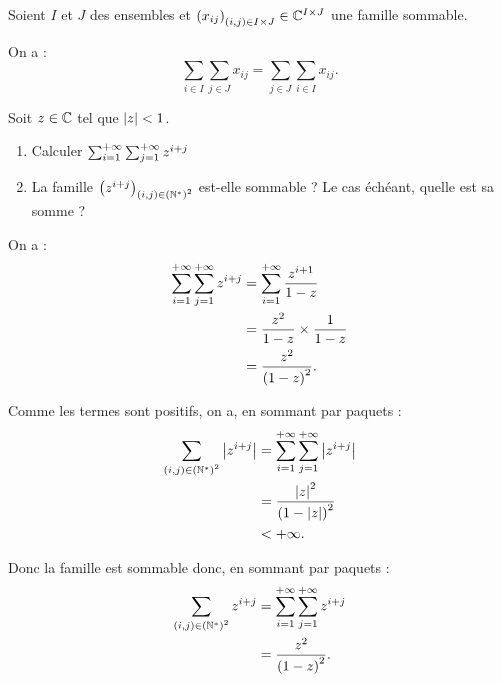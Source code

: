 \begin{dem}
\end{dem}

\begin{cor}
Soient \(I\) et \(J\) des ensembles et \(\left(x_{ij}\right)_{\left(i,j\right)\in I\times J}\in\mathbb{C}^{I\times J}\) une famille sommable.

On a : \[\sum_{i\in I}\sum_{j\in J}x_{ij}=\sum_{j\in J}\sum_{i\in I}x_{ij}.\]
\end{cor}

\begin{exoex}
Soit \(z\in\mathbb{C}\) tel que \(\left\lvert z\right\rvert<1\).

\begin{enumerate}
    \item Calculer \(\sum_{i=1}^{+\infty}\sum_{j=1}^{+\infty}z^{i+j}\) \\
    \item La famille \(\left(z^{i+j}\right)_{\left(i,j\right)\in\left(\mathbb{N}^*\right)^2}\) est-elle sommable ? Le cas échéant, quelle est sa somme ?
\end{enumerate}
\end{exoex}

\begin{corr}[1]
On a : \[\begin{aligned}
\sum_{i=1}^{+\infty}\sum_{j=1}^{+\infty}z^{i+j}&=\sum_{i=1}^{+\infty}\dfrac{z^{i+1}}{1-z} \\
&=\dfrac{z^2}{1-z}\times\dfrac{1}{1-z} \\
&=\dfrac{z^2}{\left(1-z\right)^2}.
\end{aligned}\]
\end{corr}

\begin{corr}[2]
Comme les termes sont positifs, on a, en sommant par paquets : \[\begin{aligned}
\sum_{\left(i,j\right)\in\left(\mathbb{N}^*\right)^2}\left\lvert z^{i+j}\right\rvert&=\sum_{i=1}^{+\infty}\sum_{j=1}^{+\infty}\left\lvert z^{i+j}\right\rvert \\
&=\dfrac{\left\lvert z\right\rvert^2}{\left(1-\left\lvert z\right\rvert\right)^2} \\
&<+\infty.
\end{aligned}\]

Donc la famille est sommable donc, en sommant par paquets : \[\begin{aligned}
\sum_{\left(i,j\right)\in\left(\mathbb{N}^*\right)^2}z^{i+j}&=\sum_{i=1}^{+\infty}\sum_{j=1}^{+\infty}z^{i+j} \\
&=\dfrac{z^2}{\left(1-z\right)^2}.
\end{aligned}\]
\end{corr}

